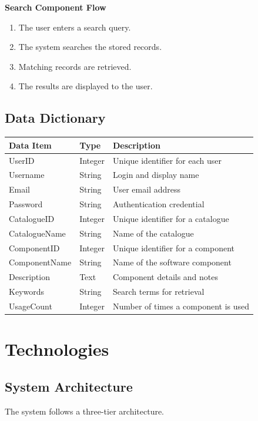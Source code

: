 \documentclass[12pt]{article}
\begin{document}
\textbf{Search Component Flow}
\begin{enumerate}[leftmargin=1.2cm]
    \item The user enters a search query.
    \item The system searches the stored records.
    \item Matching records are retrieved.
    \item The results are displayed to the user.
\end{enumerate}

\subsection{Data Dictionary}
\begin{longtable}{p{3.4cm}p{3cm}p{7cm}}
\toprule
\textbf{Data Item} & \textbf{Type} & \textbf{Description} \\
\midrule
\endhead
UserID & Integer & Unique identifier for each user \\
Username & String & Login and display name \\
Email & String & User email address \\
Password & String & Authentication credential \\
CatalogueID & Integer & Unique identifier for a catalogue \\
CatalogueName & String & Name of the catalogue \\
ComponentID & Integer & Unique identifier for a component \\
ComponentName & String & Name of the software component \\
Description & Text & Component details and notes \\
Keywords & String & Search terms for retrieval \\
UsageCount & Integer & Number of times a component is used \\
\bottomrule
\end{longtable}

\section{Technologies}

\subsection{System Architecture}
The system follows a three-tier architecture.
\end{document}
